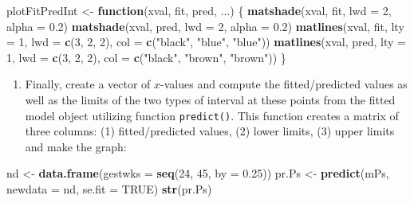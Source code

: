 \documentclass[
]{book}
\newenvironment{Shaded}{\begin{snugshade}}{\end{snugshade}}
\newcommand{\AttributeTok}[1]{\textcolor[rgb]{0.13,0.29,0.53}{#1}}
\newcommand{\ConstantTok}[1]{\textcolor[rgb]{0.56,0.35,0.01}{#1}}
\newcommand{\ControlFlowTok}[1]{\textcolor[rgb]{0.13,0.29,0.53}{\textbf{#1}}}
\newcommand{\DecValTok}[1]{\textcolor[rgb]{0.00,0.00,0.81}{#1}}
\newcommand{\FloatTok}[1]{\textcolor[rgb]{0.00,0.00,0.81}{#1}}
\newcommand{\FunctionTok}[1]{\textcolor[rgb]{0.13,0.29,0.53}{\textbf{#1}}}
\newcommand{\NormalTok}[1]{#1}
\newcommand{\OtherTok}[1]{\textcolor[rgb]{0.56,0.35,0.01}{#1}}
\newcommand{\StringTok}[1]{\textcolor[rgb]{0.31,0.60,0.02}{#1}}
\providecommand{\tightlist}{%
  \setlength{\itemsep}{0pt}\setlength{\parskip}{0pt}}
\theoremstyle{definition}
\theoremstyle{definition}
\theoremstyle{definition}
\theoremstyle{definition}
\theoremstyle{remark}
\begin{document}
\begin{Shaded}
\begin{Highlighting}[]
\NormalTok{plotFitPredInt }\OtherTok{\textless{}{-}} \ControlFlowTok{function}\NormalTok{(xval, fit, pred, ...) \{}
  \FunctionTok{matshade}\NormalTok{(xval, fit, }\AttributeTok{lwd =} \DecValTok{2}\NormalTok{, }\AttributeTok{alpha =} \FloatTok{0.2}\NormalTok{)}
  \FunctionTok{matshade}\NormalTok{(xval, pred, }\AttributeTok{lwd =} \DecValTok{2}\NormalTok{, }\AttributeTok{alpha =} \FloatTok{0.2}\NormalTok{)}
  \FunctionTok{matlines}\NormalTok{(xval, fit, }\AttributeTok{lty =} \DecValTok{1}\NormalTok{, }\AttributeTok{lwd =} \FunctionTok{c}\NormalTok{(}\DecValTok{3}\NormalTok{, }\DecValTok{2}\NormalTok{, }\DecValTok{2}\NormalTok{), }\AttributeTok{col =} \FunctionTok{c}\NormalTok{(}\StringTok{"black"}\NormalTok{, }\StringTok{"blue"}\NormalTok{, }\StringTok{"blue"}\NormalTok{))}
  \FunctionTok{matlines}\NormalTok{(xval, pred, }\AttributeTok{lty =} \DecValTok{1}\NormalTok{, }\AttributeTok{lwd =} \FunctionTok{c}\NormalTok{(}\DecValTok{3}\NormalTok{, }\DecValTok{2}\NormalTok{, }\DecValTok{2}\NormalTok{), }\AttributeTok{col =} \FunctionTok{c}\NormalTok{(}\StringTok{"black"}\NormalTok{, }\StringTok{"brown"}\NormalTok{, }\StringTok{"brown"}\NormalTok{))}
\NormalTok{\}}
\end{Highlighting}
\end{Shaded}

\begin{enumerate}
\def\labelenumi{\arabic{enumi}.}
\setcounter{enumi}{2}
\tightlist
\item
  Finally, create a vector of \(x\)-values and compute
  the fitted/predicted values as well
  as the limits of the two types of interval
  at these points from the fitted model object utilizing
  function \texttt{predict()}.
  This function creates a matrix of three columns: (1) fitted/predicted
  values, (2) lower limits, (3) upper limits and
  make the graph:
\end{enumerate}

\begin{Shaded}
\begin{Highlighting}[]
\NormalTok{nd }\OtherTok{\textless{}{-}} \FunctionTok{data.frame}\NormalTok{(}\AttributeTok{gestwks =} \FunctionTok{seq}\NormalTok{(}\DecValTok{24}\NormalTok{, }\DecValTok{45}\NormalTok{, }\AttributeTok{by =} \FloatTok{0.25}\NormalTok{))}
\NormalTok{pr.Ps }\OtherTok{\textless{}{-}} \FunctionTok{predict}\NormalTok{(mPs, }\AttributeTok{newdata =}\NormalTok{ nd, }\AttributeTok{se.fit =} \ConstantTok{TRUE}\NormalTok{)}
\FunctionTok{str}\NormalTok{(pr.Ps) }
\end{Highlighting}
\end{Shaded}
\end{document}
